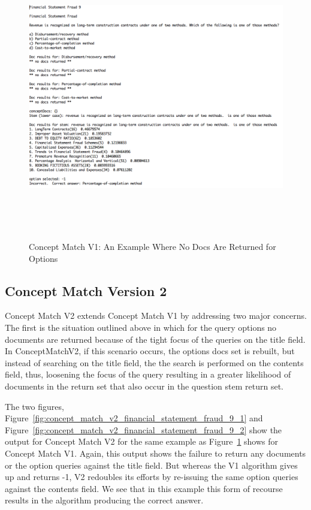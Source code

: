 \begin{figure}
\centering
\vspace{1.0in}
\includegraphics[width=125mm, height=125mm]{concept_match_v1_financial_statement_fraud_9.png}
\caption{Concept Match V1: An Example Where No Docs Are Returned for Options}
\label{fig:concept_match_v1_financial_statement_fraud_9}
\end{figure}


\subsection{Concept Match Version 2}

Concept Match V2 extends Concept Match V1 by addressing two major concerns.  The first is the situation outlined above in which for the query options no documents are returned because of the tight focus of the queries on the title field.  In ConceptMatchV2, if this scenario occurs, the options docs set is rebuilt, but instead of searching on the title field, the the search is performed on the contents field, thus, loosening the focus of the query resulting in a greater likelihood of documents in the return set that also occur in the question stem return set.  

The two figures, Figure~\ref{fig:concept_match_v2_financial_statement_fraud_9_1} and Figure~\ref{fig:concept_match_v2_financial_statement_fraud_9_2}  show the output for Concept Match V2 for the same example as  Figure~\ref{fig:concept_match_v1_financial_statement_fraud_9} shows for Concept Match V1.  Again, this output shows the failure to return any documents or the option queries against the title field.  But whereas the V1 algorithm gives up and returns -1, V2 redoubles its efforts by re-issuing the same option queries against the contents field.  We see that in this example this form of recourse results in the algorithm producing the correct answer.

